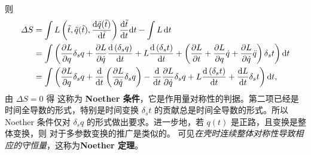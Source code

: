 则
\begin{align*}  \Delta S &=\int  L\left(\tilde{t}, \tilde{q}(\tilde{t}), \frac{\mathrm{d} \tilde{q}(\tilde{t})}{\mathrm{d} \tilde{t}}\right) \frac{\mathrm{d} \tilde{t}}{\mathrm{d} t} \dd t-\int  L\,\dd t \\& =\int \left(\frac{\partial L}{\partial q} \delta_s q+\frac{\partial L}{\partial \dot{q}} \frac{\mathrm{d}\left(\delta_s q\right)}{\mathrm{d} t}+L \frac{\mathrm{d}\left(\delta_s t\right)}{\mathrm{d} t}  +\left(\frac{\partial L}{\partial t}+\frac{\partial L}{\partial q} \dot{q}+\frac{\partial L}{\partial \dot{q}} \ddot{q}\right) \delta_s t\right)\dd t \\ & =\int \left(\frac{\partial L}{\partial q} \delta_s q+\frac{\mathrm{d}}{\mathrm{d} t}\left(\frac{\partial L}{\partial \dot{q}} \delta_s q\right)-\frac{\mathrm{d}}{\mathrm{d} t} \frac{\partial L}{\partial \dot{q}} \delta_s q+L \frac{\mathrm{d}\left(\delta_s t\right)}{\mathrm{d} t}  +\frac{\mathrm{d} L}{\mathrm{d} t} \delta_s t\right)\dd t,
\end{align*}
由 $\Delta S=0$ 得
这称为 \textbf{Noether 条件}，它是作用量对称性的判据。第二项已经是时间全导数的形式，特别是时间变换 $\delta_s t$ 的贡献总是时间全导数的形式。所以 Noether 条件仅对 $\delta_s q$ 的形式做出要求。进一步地，若 $q(t)$ 是正路，且变换是整体变换，则
对于多参数变换的推广是类似的。
可见\textit{在壳时连续整体对称性导致相应的守恒量}，这称为\textbf{Noether 定理}。

